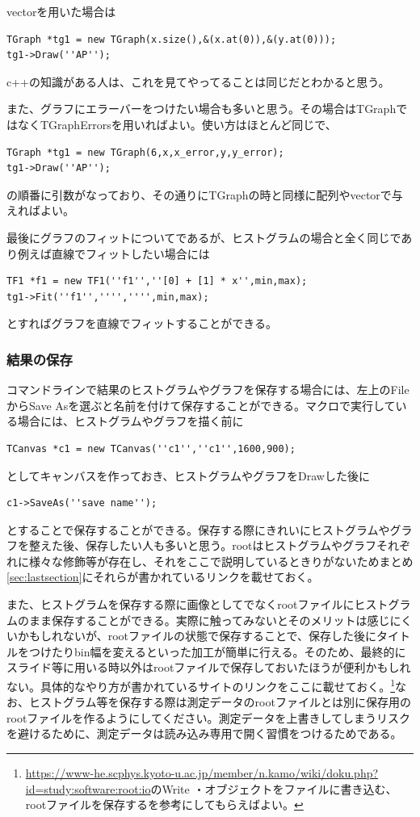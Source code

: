 \documentclass[10pt]{ujarticle}
\begin{document}
vectorを用いた場合は
\begin{lstlisting}
TGraph *tg1 = new TGraph(x.size(),&(x.at(0)),&(y.at(0)));
tg1->Draw(''AP'');
 \end{lstlisting}
c++の知識がある人は、これを見てやってることは同じだとわかると思う。

また、グラフにエラーバーをつけたい場合も多いと思う。その場合はTGraphではなくTGraphErrorsを用いればよい。使い方はほとんど同じで、
\begin{lstlisting}
TGraph *tg1 = new TGraph(6,x,x_error,y,y_error);
tg1->Draw(''AP'');
 \end{lstlisting}
 の順番に引数がなっており、その通りにTGraphの時と同様に配列やvectorで与えればよい。

最後にグラフのフィットについてであるが、ヒストグラムの場合と全く同じであり例えば直線でフィットしたい場合には
\begin{lstlisting}
TF1 *f1 = new TF1(''f1'',''[0] + [1] * x'',min,max);
tg1->Fit(''f1'','''','''',min,max);
 \end{lstlisting}
とすればグラフを直線でフィットすることができる。

\subsubsection{結果の保存}
コマンドラインで結果のヒストグラムやグラフを保存する場合には、左上のFileからSave Asを選ぶと名前を付けて保存することができる。マクロで実行している場合には、ヒストグラムやグラフを描く前に
\begin{lstlisting}
TCanvas *c1 = new TCanvas(''c1'',''c1'',1600,900);
 \end{lstlisting}
としてキャンバスを作っておき、ヒストグラムやグラフをDrawした後に
\begin{lstlisting}
c1->SaveAs(''save name'');
 \end{lstlisting}
とすることで保存することができる。保存する際にきれいにヒストグラムやグラフを整えた後、保存したい人も多いと思う。rootはヒストグラムやグラフそれぞれに様々な修飾等が存在し、それをここで説明しているときりがないためまとめ\ref{sec:lastsection}にそれらが書かれているリンクを載せておく。

また、ヒストグラムを保存する際に画像としてでなくrootファイルにヒストグラムのまま保存することができる。実際に触ってみないとそのメリットは感じにくいかもしれないが、rootファイルの状態で保存することで、保存した後にタイトルをつけたりbin幅を変えるといった加工が簡単に行える。そのため、最終的にスライド等に用いる時以外はrootファイルで保存しておいたほうが便利かもしれない。具体的なやり方が書かれているサイトのリンクをここに載せておく。\footnote{\url{https://www-he.scphys.kyoto-u.ac.jp/member/n.kamo/wiki/doku.php?id=study:software:root:io}のWrite ・オブジェクトをファイルに書き込む、rootファイルを保存するを参考にしてもらえばよい。}なお、ヒストグラム等を保存する際は測定データのrootファイルとは別に保存用のrootファイルを作るようにしてください。測定データを上書きしてしまうリスクを避けるために、測定データは読み込み専用で開く習慣をつけるためである。
\end{document}
